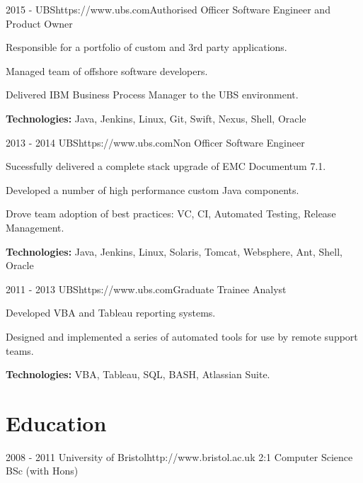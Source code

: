 \documentclass[10pt]{article} %
\begin{document}
\job
{2015 -}
{UBS}{https://www.ubs.com}{Authorised Officer}
{Software Engineer and Product Owner}
{\begin{itemize-noindent}
\setlength\itemsep{-0.2em}
\item Responsible for a portfolio of custom and 3rd party applications.
\item Managed team of offshore software developers.
\item Delivered IBM Business Process Manager to the UBS environment.
\end{itemize-noindent}
\textbf{Technologies:} Java, Jenkins, Linux, Git, Swift, Nexus, Shell, Oracle}

\job
{2013 - 2014}
{UBS}{https://www.ubs.com}{Non Officer}
{Software Engineer}
{\begin{itemize-noindent}
\setlength\itemsep{-0.2em}
\item Sucessfully delivered a complete stack upgrade of EMC Documentum 7.1.
\item Developed a number of high performance custom Java components.
\item Drove team adoption of best practices: VC, CI, Automated Testing, Release Management.
\end{itemize-noindent}
\textbf{Technologies:} Java, Jenkins, Linux, Solaris, Tomcat, Websphere, Ant, Shell, Oracle}


\job
{2011 - 2013}
{UBS}{https://www.ubs.com}{Graduate Trainee}
{Analyst}
{\begin{itemize-noindent}
\setlength\itemsep{-0.2em}
\item Developed VBA and Tableau reporting systems.
\item Designed and implemented a series of automated tools for use by remote support teams.
\end{itemize-noindent}
\textbf{Technologies:} VBA, Tableau, SQL, BASH, Atlassian Suite.}


\section{Education}

\university
{2008 - 2011}
{University of Bristol}{http://www.bristol.ac.uk}
{2:1 Computer Science BSc (with Hons)}
\end{document}
